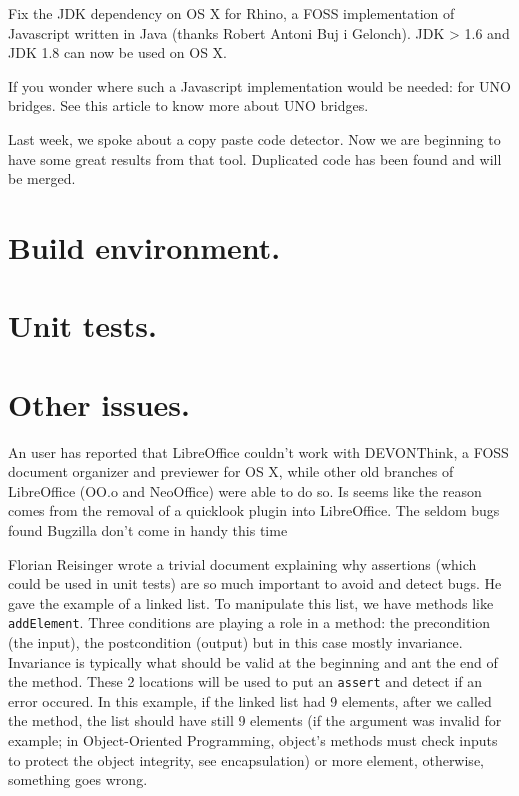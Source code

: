\documentclass{article}
\begin{document}
Fix the JDK dependency on OS X for Rhino\cite{javaDepRhino1}\cite{javaDepRhino2}, a FOSS implementation of Javascript written in Java\cite{rhinoDefinition} (thanks Robert Antoni Buj i Gelonch). JDK > 1.6 and JDK 1.8 can now be used on OS X.

If you wonder where such a Javascript implementation would be needed: for UNO bridges. See this article to know more about UNO bridges\cite{unoBridges}.


Last week, we spoke about a copy paste code detector. Now we are beginning to have some great results from that tool. Duplicated code has been found and will be merged\cite{duplicateFound}.


\section{Build environment.}




\section{Unit tests.}




\section{Other issues.}

An user has reported that LibreOffice couldn't work with DEVONThink, a FOSS document organizer and previewer for OS X, while other old branches of LibreOffice (OO.o and NeoOffice) were able to do so. Is seems like the reason comes from the removal of a quicklook plugin into LibreOffice. The seldom bugs found Bugzilla don't come in handy this time\cite{quicklookPlugin}

Florian Reisinger wrote a trivial document explaining why assertions (which could be used in unit tests) are so much important to avoid and detect bugs. He gave the example of a linked list. To manipulate this list, we have methods like \lstinline{addElement}. Three conditions are playing a role in a method: the precondition (the input), the postcondition (output) but in this case mostly invariance. Invariance is  typically what should be valid at the beginning and ant the end of the method. These 2 locations will be used to put an \lstinline{assert} and detect if an error occured. In this example, if the linked list had 9 elements, after we called the method, the list should have still 9 elements (if the argument was invalid for example; in Object-Oriented Programming, object's methods must check inputs to protect the object integrity, see encapsulation) or more element, otherwise, something goes wrong\cite{assertionsUnitTest}.
\end{document}

